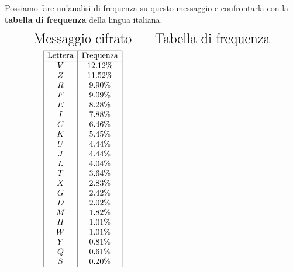 \documentclass{report}
\begin{document}
Possiamo fare un'analisi di frequenza su questo messaggio e confrontarla con la \textbf{tabella di frequenza} della lingua italiana.


\[
\begin{array}{c@{\hskip 1cm}c} %

\text{\LARGE Messaggio cifrato} & \text{\LARGE Tabella di frequenza} \\ [0.2cm]

\begin{array}{|c|c|}
\hline
\text{Lettera} & \text{Frequenza} \\ \hline
V & 12.12\%  \\ 
 Z & 11.52\%  \\ 
 R & 9.90\%  \\ 
 F & 9.09\%  \\ 
 E & 8.28\%  \\ 
 I & 7.88\%  \\ 
 C & 6.46\%  \\ 
 K & 5.45\%  \\ 
 U & 4.44\%  \\ 
 J & 4.44\%  \\ 
 L & 4.04\%  \\ 
 T & 3.64\%  \\ 
 X & 2.83\%  \\ 
 G & 2.42\%  \\ 
 D & 2.02\%  \\ 
 M & 1.82\%  \\ 
 H & 1.01\%  \\ 
 W & 1.01\%  \\ 
 Y & 0.81\%  \\ 
 Q & 0.61\%  \\ 
 S & 0.20\%  \\ 
 

\end{array}
\end{array}\]
\end{document}

